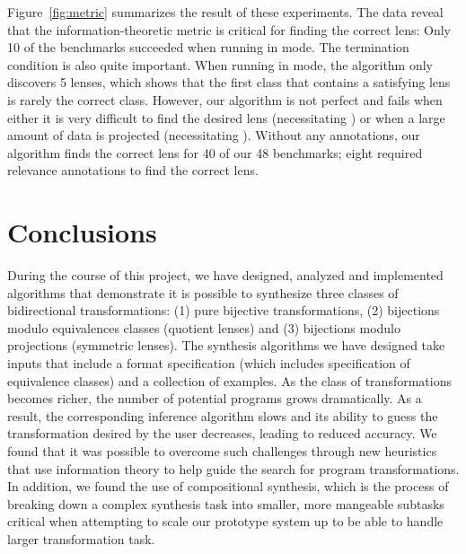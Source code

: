 \documentclass[12pt]{article}
\begin{document}
{Figure~\ref{fig:metric} summarizes the result of these experiments. The data
reveal that the information-theoretic metric is critical for finding the correct
lens: Only 10 of the benchmarks succeeded when running in \CCOpt{} mode. The
termination condition is also quite important. When running in \FLOpt{} mode,
the algorithm only discovers 5 lenses, which shows that the first class that
contains a satisfying lens is rarely the correct class. However, our algorithm
is not perfect and fails when either it is very difficult to find the desired
lens (necessitating \SRequire) or when a large amount of data is projected
(necessitating \Skip). Without any annotations, our algorithm finds the correct
lens for 40 of our 48 benchmarks; eight required relevance annotations to find
the correct lens.

\section{Conclusions}

During the course of this project, we have designed, analyzed and
implemented algorithms that demonstrate it is possible to synthesize
three classes of bidirectional transformations: (1) pure bijective
transformations, (2) bijections modulo equivalences classes (quotient
lenses) and (3)
bijections modulo projections (symmetric lenses).  The synthesis algorithms we have
designed take inputs that include a format specification (which
includes specification of equivalence classes) and a collection of
examples.  As the class of transformations becomes richer, the number
of potential programs grows dramatically.  As a result, the
corresponding inference algorithm slows and its ability to guess the
transformation desired by the user decreases, leading to reduced
accuracy.  We found that it was possible to overcome such challenges
through new heuristics that use information theory to help guide the
search for program transformations.  In addition, we found the use of
compositional synthesis, which is the process of breaking down a
complex synthesis task into smaller, more mangeable subtasks critical
when attempting to scale our prototype system up to be able to handle
larger transformation task.




}
\end{document}
